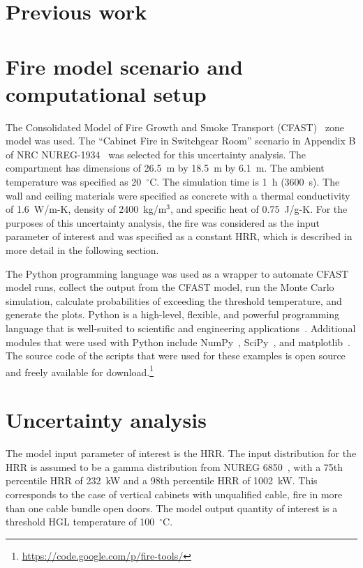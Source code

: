 \documentclass[12pt]{article}
\begin{document}
\section{Previous work}
\label{sec:previous_work}




\section{Fire model scenario and computational setup}
\label{sec:fire_model_scenario_setup}

The Consolidated Model of Fire Growth and Smoke Transport (CFAST)~\cite{CFAST_Users_Guide_6} zone model was used. The ``Cabinet Fire in Switchgear Room'' scenario in Appendix B of NRC NUREG-1934~\cite{NUREG_1934} was selected for this uncertainty analysis. The compartment has dimensions of 26.5~m by 18.5~m by 6.1~m. The ambient temperature was specified as 20~$^\circ$C. The simulation time is 1~h (3600~s). The wall and ceiling materials were specified as concrete with a thermal conductivity of 1.6~W/m-K, density of 2400~kg/m$^3$, and specific heat of 0.75~J/g-K. For the purposes of this uncertainty analysis, the fire was considered as the input parameter of interest and was specified as a constant HRR, which is described in more detail in the following section.

The Python programming language was used as a wrapper to automate CFAST model runs, collect the output from the CFAST model, run the Monte Carlo simulation, calculate probabilities of exceeding the threshold temperature, and generate the plots. Python is a high-level, flexible, and powerful programming language that is well-suited to scientific and engineering applications~\cite{Oliphant:2007}. Additional modules that were used with Python include NumPy~\cite{oliphant2006guide}, SciPy~\cite{Jones:2001fk}, and matplotlib~\cite{Hunter:2007}. The source code of the scripts that were used for these examples is open source and freely available for download.\footnote{\url{https://code.google.com/p/fire-tools/}}


\section{Uncertainty analysis}
\label{sec:uncertainty_analysis}

The model input parameter of interest is the HRR. The input distribution for the HRR is assumed to be a gamma distribution from NUREG 6850~\cite{NUREG_6850}, with a 75th percentile HRR of 232~kW and a 98th percentile HRR of 1002~kW. This corresponds to the case of vertical cabinets with unqualified cable, fire in more than one cable bundle open doors. The model output quantity of interest is a threshold HGL temperature of 100~$^\circ$C.
\end{document}
